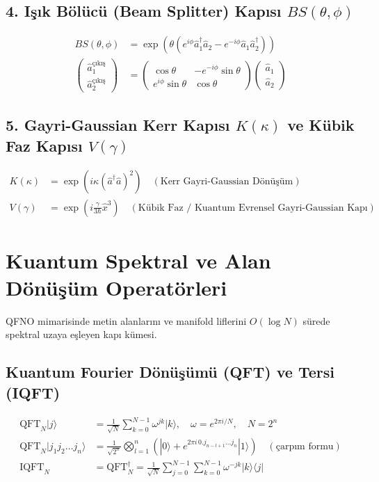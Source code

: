 \documentclass[11pt, a4paper]{article}
\begin{document}
\subsection{4. Işık Bölücü (Beam Splitter) Kapısı $BS(\theta, \phi)$}
\begin{align}
BS(\theta, \phi) &= \exp\left( \theta (e^{i\phi} \hat{a}_1^\dagger \hat{a}_2 - e^{-i\phi} \hat{a}_1 \hat{a}_2^\dagger) \right) \\
\begin{pmatrix} \hat{a}_1^{\text{çıkış}} \\ \hat{a}_2^{\text{çıkış}} \end{pmatrix} &= \begin{pmatrix} \cos\theta & -e^{-i\phi}\sin\theta \\ e^{i\phi}\sin\theta & \cos\theta \end{pmatrix} \begin{pmatrix} \hat{a}_1 \\ \hat{a}_2 \end{pmatrix}
\end{align}

\subsection{5. Gayri-Gaussian Kerr Kapısı $K(\kappa)$ ve Kübik Faz Kapısı $V(\gamma)$}
\begin{align}
K(\kappa) &= \exp\left( i \kappa (\hat{a}^\dagger \hat{a})^2 \right) \quad (\text{Kerr Gayri-Gaussian Dönüşüm}) \\
V(\gamma) &= \exp\left( i \frac{\gamma}{3\hbar} \hat{x}^3 \right) \quad (\text{Kübik Faz / Kuantum Evrensel Gayri-Gaussian Kapı})
\end{align}

\section{Kuantum Spektral ve Alan Dönüşüm Operatörleri}

QFNO mimarisinde metin alanlarını ve manifold liflerini $O(\log N)$ sürede spektral uzaya eşleyen kapı kümesi.

\subsection{Kuantum Fourier Dönüşümü (QFT) ve Tersi (IQFT)}
\begin{align}
\text{QFT}_N |j\rangle &= \frac{1}{\sqrt{N}} \sum_{k=0}^{N-1} \omega^{j k} |k\rangle, \quad \omega = e^{2\pi i / N}, \quad N = 2^n \\
\text{QFT}_N |j_1 j_2 \dots j_n\rangle &= \frac{1}{\sqrt{2^n}} \bigotimes_{l=1}^n \left( |0\rangle + e^{2\pi i\, 0.j_{n-l+1} \dots j_n} |1\rangle \right) \quad (\text{çarpım formu}) \\
\text{IQFT}_N &= \text{QFT}_N^\dagger = \frac{1}{\sqrt{N}} \sum_{j=0}^{N-1} \sum_{k=0}^{N-1} \omega^{-j k} |k\rangle \langle j|
\end{align}
\end{document}
